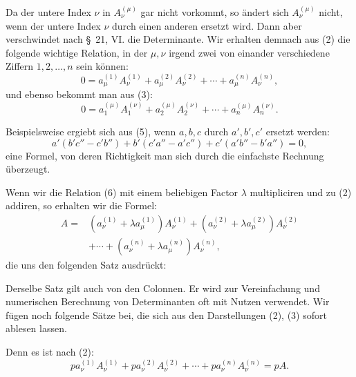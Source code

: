
Da der untere Index \(\nu\) in \(A_\nu^{(\mu)}\) gar nicht vorkommt, so ändert sich \(A_\nu^{(\mu)}\) nicht, wenn der untere Index \(\nu\) durch einen anderen ersetzt wird. Dann aber verschwindet nach \S~21, VI. die Determinante. Wir erhalten demnach aus (2) die folgende wichtige Relation, in der \(\mu,\nu\) irgend zwei von einander verschiedene Ziffern \(1,2,\ldots,n\) sein können:
\begin{equation}
0=a_\mu^{(1)}A_\nu^{(1)}+a_\mu^{(2)}A_\nu^{(2)}+\cdots+a_\mu^{(n)}A_\nu^{(n)},
\tag{6}
\end{equation}
und ebenso bekommt man aus (3):
\begin{equation}
0=a_1^{(\mu)}A_1^{(\nu)}+a_2^{(\mu)}A_2^{(\nu)}+\cdots+a_n^{(\mu)}A_n^{(\nu)}.
\tag{7}
\end{equation}

Beispielsweise ergiebt sich aus (5), wenn \(a,b,c\) durch \(a',b',c'\) ersetzt werden:
\begin{equation}
a'(b'c''-c'b'')+b'(c'a''-a'c'')+c'(a'b''-b'a'')=0,
\tag{8}
\end{equation}
eine Formel, von deren Richtigkeit man sich durch die einfachste Rechnung überzeugt.

Wenn wir die Relation (6) mit einem beliebigen Factor \(\lambda\) multipliciren und zu (2) addiren, so erhalten wir die Formel:
\begin{equation}
\begin{aligned}
A={}&(a_\nu^{(1)}+\lambda a_\mu^{(1)})A_\nu^{(1)}
+(a_\nu^{(2)}+\lambda a_\mu^{(2)})A_\nu^{(2)}\\
&+\cdots+(a_\nu^{(n)}+\lambda a_\mu^{(n)})A_\nu^{(n)},
\end{aligned}
\tag{9}
\end{equation}
die uns den folgenden Satz ausdrückt:


Derselbe Satz gilt auch von den Colonnen. Er wird zur Vereinfachung und numerischen Berechnung von Determinanten oft mit Nutzen verwendet. Wir fügen noch folgende Sätze bei, die sich aus den Darstellungen (2), (3) sofort ablesen lassen.


Denn es ist nach (2):
\[
p a_\nu^{(1)}A_\nu^{(1)}+p a_\nu^{(2)}A_\nu^{(2)}+\cdots+p a_\nu^{(n)}A_\nu^{(n)}=pA.
\]


